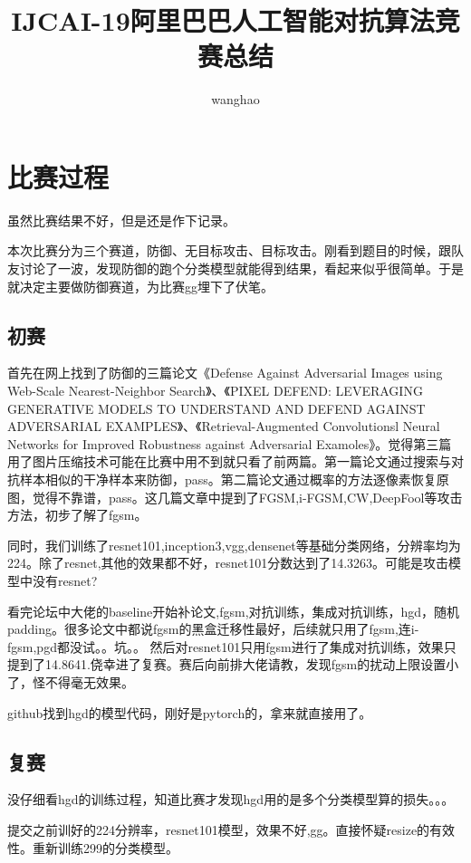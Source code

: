 \documentclass[]{article}
\title{IJCAI-19阿里巴巴人工智能对抗算法竞赛总结}
\author{wanghao}
\begin{document}
\maketitle

\section{比赛过程}
虽然比赛结果不好，但是还是作下记录。

本次比赛分为三个赛道，防御、无目标攻击、目标攻击。刚看到题目的时候，跟队友讨论了一波，发现防御的跑个分类模型就能得到结果，看起来似乎很简单。于是就决定主要做防御赛道，为比赛gg埋下了伏笔。






\subsection{初赛}

首先在网上找到了防御的三篇论文《Defense Against Adversarial Images using Web-Scale Nearest-Neighbor Search》、《PIXEL DEFEND: LEVERAGING GENERATIVE MODELS TO UNDERSTAND AND DEFEND AGAINST ADVERSARIAL EXAMPLES》、《Retrieval-Augmented Convolutionsl Neural Networks for Improved Robustness against Adversarial Examoles》。觉得第三篇用了图片压缩技术可能在比赛中用不到就只看了前两篇。第一篇论文通过搜索与对抗样本相似的干净样本来防御，pass。第二篇论文通过概率的方法逐像素恢复原图，觉得不靠谱，pass。这几篇文章中提到了FGSM,i-FGSM,CW,DeepFool等攻击方法，初步了解了fgsm。

同时，我们训练了resnet101,inception3,vgg,densenet等基础分类网络，分辨率均为224。除了resnet,其他的效果都不好，resnet101分数达到了14.3263。可能是攻击模型中没有resnet?

看完论坛中大佬的baseline开始补论文,fgsm,对抗训练，集成对抗训练，hgd，随机padding。很多论文中都说fgsm的黑盒迁移性最好，后续就只用了fgsm,连i-fgsm,pgd都没试。。坑。。
然后对resnet101只用fgsm进行了集成对抗训练，效果只提到了14.8641.侥幸进了复赛。赛后向前排大佬请教，发现fgsm的扰动上限设置小了，怪不得毫无效果。

github找到hgd的模型代码，刚好是pytorch的，拿来就直接用了。
\subsection{复赛}

没仔细看hgd的训练过程，知道比赛才发现hgd用的是多个分类模型算的损失。。。

提交之前训好的224分辨率，resnet101模型，效果不好,gg。直接怀疑resize的有效性。重新训练299的分类模型。
\end{document}
